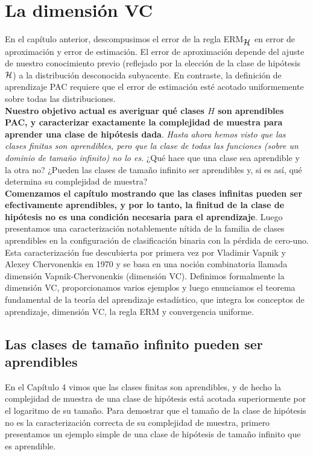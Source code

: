 \chapter{La dimensión VC}
En el capítulo anterior, descompusimos el error de la regla ERM$_{\mathop{\mbox{$\mathcal{H}$}}\nolimits}$ en error de aproximación y error de estimación. El error de aproximación depende del ajuste de nuestro conocimiento previo (reflejado por la elección de la clase de hipótesis $\mathop{\mbox{$\mathcal{H}$}}\nolimits$) a la distribución desconocida subyacente. En contraste, la definición de aprendizaje PAC requiere que el error de estimación esté acotado uniformemente sobre todas las distribuciones.\\

\textbf{Nuestro objetivo actual es averiguar qué clases $H$ son aprendibles PAC, y caracterizar exactamente la complejidad de muestra para aprender una clase de hipótesis dada}. \textit{Hasta ahora hemos visto que las clases finitas son aprendibles, pero que la clase de todas las funciones (sobre un dominio de tamaño infinito) no lo es}. ¿Qué hace que una clase sea aprendible y la otra no? ¿Pueden las clases de tamaño infinito ser aprendibles y, si es así, qué determina su complejidad de muestra?\\

\textbf{Comenzamos el capítulo mostrando que las clases infinitas pueden ser efectivamente aprendibles, y por lo tanto, la finitud de la clase de hipótesis no es una condición necesaria para el aprendizaje}. Luego presentamos una caracterización notablemente nítida de la familia de clases aprendibles en la configuración de clasificación binaria con la pérdida de cero-uno. Esta caracterización fue descubierta por primera vez por Vladimir Vapnik y Alexey Chervonenkis en 1970 y se basa en una noción combinatoria llamada dimensión Vapnik-Chervonenkis (dimensión VC). Definimos formalmente la dimensión VC, proporcionamos varios ejemplos y luego enunciamos el teorema fundamental de la teoría del aprendizaje estadístico, que integra los conceptos de aprendizaje, dimensión VC, la regla ERM y convergencia uniforme.

\section{Las clases de tamaño infinito pueden ser aprendibles}
En el Capítulo 4 vimos que las clases finitas son aprendibles, y de hecho la complejidad de muestra de una clase de hipótesis está acotada superiormente por el logaritmo de su tamaño. Para demostrar que el tamaño de la clase de hipótesis no es la caracterización correcta de su complejidad de muestra, primero presentamos un ejemplo simple de una clase de hipótesis de tamaño infinito que es aprendible.


